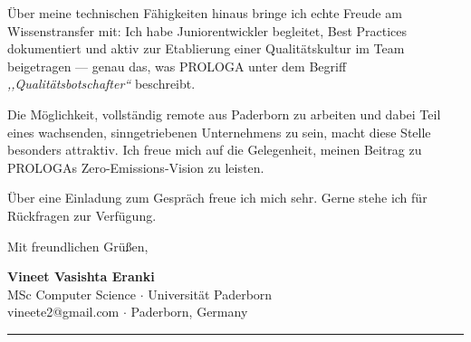 \documentclass[10.5pt, a4paper]{article}
\begin{document}
\"{U}ber meine technischen F\"{a}higkeiten hinaus bringe ich echte Freude am Wissenstransfer mit: Ich habe Juniorentwickler begleitet, Best Practices dokumentiert und aktiv zur Etablierung einer Qualit\"{a}tskultur im Team beigetragen --- genau das, was PROLOGA unter dem Begriff \emph{,,Qualit\"{a}tsbotschafter``} beschreibt.

Die M\"{o}glichkeit, vollst\"{a}ndig remote aus Paderborn zu arbeiten und dabei Teil eines wachsenden, sinngetriebenen Unternehmens zu sein, macht diese Stelle besonders attraktiv. Ich freue mich auf die Gelegenheit, meinen Beitrag zu PROLOGAs Zero-Emissions-Vision zu leisten.

\"{U}ber eine Einladung zum Gespr\"{a}ch freue ich mich sehr. Gerne stehe ich f\"{u}r R\"{u}ckfragen zur Verf\"{u}gung.

\vspace{20pt}
Mit freundlichen Gr\"{u}\ss{}en,

\vspace{28pt}
\textbf{Vineet Vasishta Eranki}\\[3pt]
{\small\color{muted}
  MSc Computer Science $\cdot$ Universit\"{a}t Paderborn\\
  vineete2@gmail.com $\cdot$ Paderborn, Germany
}

\vspace{16pt}
{\color{prologreen}\rule{\linewidth}{1.8pt}}
\end{document}
